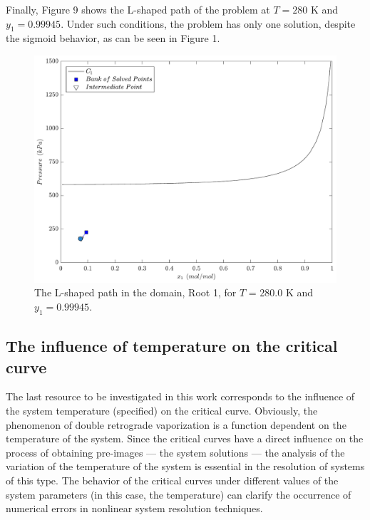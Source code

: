 \documentclass[journal=iecred,manuscript=article]{achemso}
\theoremstyle{definition}
\theoremstyle{remark}
\begin{document}
Finally, Figure 9 shows the L-shaped path of the problem at $T = 280$ K and $y_1 = 0.99945$. Under such conditions, the problem has only one solution, despite the sigmoid behavior, as can be seen in Figure 1.

\begin{figure}[!ht]
	\begin{center}
		\includegraphics[scale=0.50]{caminhos_L_degeneracao_dominio3.pdf}
		\caption{The L-shaped path in the domain, Root 1, for $T$ = 280.0 K and $y_1 = 0.99945$.}\label{fig:L_S2}
	\end{center}
\end{figure}

\subsection{The influence of temperature on the critical curve}

The last resource to be investigated in this work corresponds to the influence of the system temperature (specified) on the critical curve. Obviously, the phenomenon of double retrograde vaporization is a function dependent on the temperature of the system. Since the critical curves have a direct influence on the process of obtaining pre-images --- the system solutions --- the analysis of the variation of the temperature of the system is essential in the resolution of systems of this type. The behavior of the critical curves under different values of the system parameters (in this case, the temperature) can clarify the occurrence of numerical errors in nonlinear system resolution techniques.
\end{document}
